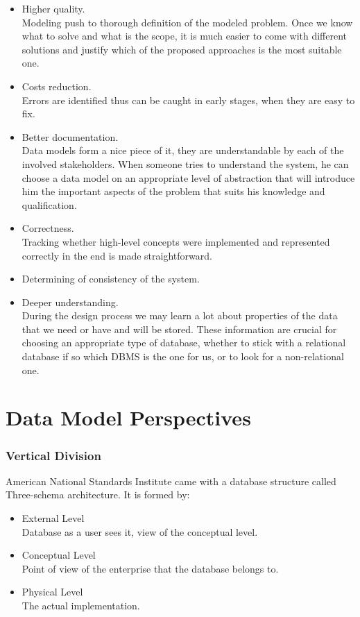 \begin{itemize}
	\item Higher quality.\\ Modeling push to thorough definition of the modeled problem. Once we know what to solve and what is the scope, it is much easier to come with different solutions and justify which of the proposed approaches is the most suitable one.
	
	\item Costs reduction.\\ Errors are identified thus can be caught in early stages, when they are easy to fix.
	
	\item Better documentation.\\ Data models form a nice piece of it, they are understandable by each of the involved stakeholders. When someone tries to understand the system, he can choose a data model on an appropriate level of abstraction that will introduce him the important aspects of the problem that suits his knowledge and qualification.
	
	\item Correctness.\\ Tracking whether high-level concepts were implemented and represented correctly in the end is made straightforward.
	
	\item Determining of consistency of the system.
	
	\item Deeper understanding.\\ During the design process we may learn a lot about properties of the data that we need or have and will be stored. These information are crucial for choosing an appropriate type of database, whether to stick with a relational database if so which DBMS is the one for us, or to look for a non-relational one.
\end{itemize}

\section{Data Model Perspectives}

\subsubsection{Vertical Division}

American National Standards Institute \cite{ANSIArchitecture75} came with a database structure called Three-schema architecture. It is formed by:
\begin{itemize}
	\item External Level \\ Database as a user sees it, view of the conceptual level. 
	\item Conceptual Level \\ Point of view of the enterprise that the database belongs to.
	\item Physical Level \\ The actual implementation.
\end{itemize}

